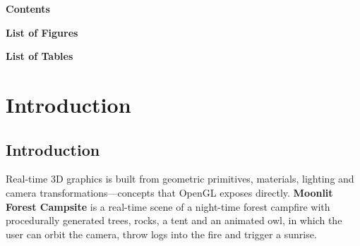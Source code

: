 \documentclass[12pt,a4paper]{report}
\begin{document}
\newpage

\thispagestyle{plain}
\begin{singlespace}
\makeatletter
\begin{center}{\fontsize{16}{24}\selectfont\bfseries Contents}\end{center}
\vspace{4pt}
\makeatother
\end{singlespace}
\newpage

\thispagestyle{plain}
\begingroup
\makeatletter
\begin{singlespace}
\begin{center}{\fontsize{16}{24}\selectfont\bfseries List of Figures}\end{center}
\vspace{4pt}
\vspace{20pt}
\begin{center}{\fontsize{16}{24}\selectfont\bfseries List of Tables}\end{center}
\vspace{4pt}
\end{singlespace}
\makeatother
\endgroup
\newpage

\setcounter{page}{1}

\titlespacing*{\section}{0pt}{6pt}{2pt}   %
\chapter{Introduction}

\section{Introduction}

Real-time 3D graphics is built from geometric primitives, materials, lighting and camera transformations---concepts that OpenGL exposes directly.
\textbf{Moonlit Forest Campsite} is a real-time scene of a night-time forest campfire with procedurally generated trees, rocks, a tent and an animated owl, in which the user can orbit the camera, throw logs into the fire and trigger a sunrise.
\end{document}
